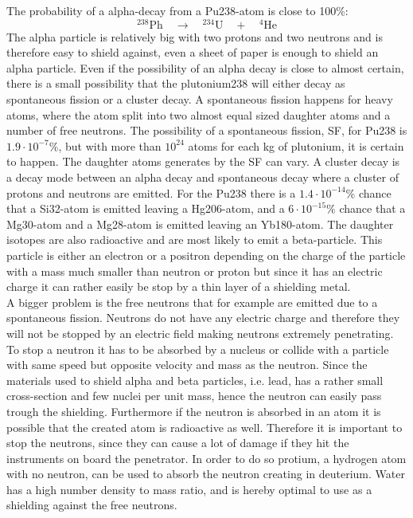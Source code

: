 \noindent
The probability of a alpha-decay from a Pu238-atom is close to 100\%: 
\begin{equation}
^{238}\text{Ph} \quad \rightarrow \quad ^{234}\text{U} \quad + \quad ^4 \text{He}
\end{equation}
The alpha particle is relatively big with two protons and two neutrons and is therefore easy to shield against, even a sheet of paper is enough to shield an alpha particle\cite{website:shielding}. Even if the possibility of an alpha decay is close to almost certain, there is a small possibility that the plutonium238 will either decay as spontaneous fission or a cluster decay\cite{website:plutonium}. A spontaneous fission happens for heavy atoms, where the atom split into two almost equal sized daughter atoms and a number of free neutrons\cite{website:spontaneous_fission}. The possibility of a spontaneous fission, SF, for Pu238 is $1.9 \cdot 10^{-7}\%$, but with more than $10^{24}$ atoms for each kg of plutonium, it is certain to happen. The daughter atoms generates by the SF can vary. A cluster decay is a decay mode between an alpha decay and spontaneous decay where a cluster of protons and neutrons are emitted. For the Pu238 there is a $1.4 \cdot 10^{-14}\%$ chance that a Si32-atom is emitted leaving a Hg206-atom, and a $6 \cdot 10^{-15}\%$ chance that a Mg30-atom and a Mg28-atom is emitted leaving an Yb180-atom. The daughter isotopes are also radioactive and are most likely to emit a beta-particle. This particle is either an electron or a positron depending on the charge of the particle with a mass much smaller than neutron or proton but since it has an electric charge it can rather easily be stop by a thin layer of a shielding metal. \\

\noindent
A bigger problem is the free neutrons that for example are emitted due to a spontaneous fission.  Neutrons do not have any electric charge and therefore they will not be stopped by an electric field making neutrons extremely penetrating. To stop a neutron it has to be absorbed by a nucleus or collide with a particle with same speed but opposite velocity and mass as the neutron. Since the materials used to shield alpha and beta particles, i.e. lead, has a rather small cross-section and few nuclei per unit mass, hence the neutron can easily pass trough the shielding. Furthermore if the neutron is absorbed in an atom it is possible that the created atom is radioactive as well. Therefore it is important to stop the neutrons, since they can cause a lot of damage if they hit the instruments on board the penetrator. In order to do so protium, a hydrogen atom with no neutron, can be used to absorb the neutron creating in deuterium. Water has a high number density to mass ratio, and is hereby optimal to use as a shielding against the free neutrons.


